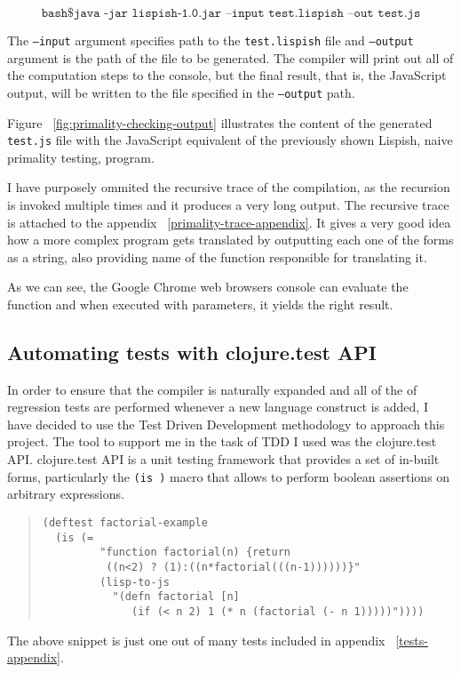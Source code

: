 $$  \texttt{bash\$ java -jar lispish-1.0.jar --input test.lispish --out test.js} $$

The \texttt{--input} argument specifies path to the \texttt{test.lispish} file and \texttt{--output} argument is the path of the file to be generated.
The compiler will print out all of the computation steps to the console, but the final result, that is, the JavaScript output, will be written to the file specified in the \texttt{--output} path.

Figure ~\ref{fig:primality-checking-output} illustrates the content of the generated \texttt{test.js} file with the JavaScript equivalent of the previously shown Lispish, naive primality testing, program. 

I have purposely ommited the recursive trace of the compilation, as the recursion is invoked multiple times and it produces a very long output. 
The recursive trace is attached to the appendix ~\ref{primality-trace-appendix}. It gives a very good idea how a more complex program gets translated by outputting each one of the forms as a string, also providing name of the function responsible for translating it. 

As we can see, the Google Chrome web browsers console can evaluate the function and when executed with parameters, it yields the right result. 

\subsection{Automating tests with clojure.test API}
In order to ensure that the compiler is naturally expanded and all of the of regression tests are performed whenever a new language construct is added, I have decided to use the Test Driven Development methodology to approach this project. 
The tool to support me in the task of TDD I used was the clojure.test API.
clojure.test API\cite{clojure.test:2011:Site} is a unit testing framework that provides a set of in-built forms, particularly the \texttt{(is )} macro that allows to perform boolean assertions on arbitrary expressions. 

\begin{quote}
\begin{verbatim}
(deftest factorial-example
  (is (= 
         "function factorial(n) {return 
          ((n<2) ? (1):((n*factorial(((n-1))))))}"
         (lisp-to-js 
           "(defn factorial [n] 
              (if (< n 2) 1 (* n (factorial (- n 1)))))"))))
\end{verbatim}
\end{quote}

The above snippet is just one out of many tests included in appendix ~\ref{tests-appendix}. 


